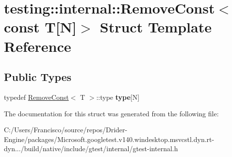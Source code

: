 \hypertarget{structtesting_1_1internal_1_1_remove_const_3_01const_01_t[_n]_4}{}\section{testing\+:\+:internal\+:\+:Remove\+Const$<$ const T\mbox{[}N\mbox{]}$>$ Struct Template Reference}
\label{structtesting_1_1internal_1_1_remove_const_3_01const_01_t[_n]_4}
\subsection*{Public Types}
\begin{DoxyCompactItemize}
\item 
\mbox{\label{structtesting_1_1internal_1_1_remove_const_3_01const_01_t[_n]_4_ac976b53cb5d031a120fafbe790650068}} 
typedef \hyperlink{structtesting_1_1internal_1_1_remove_const}{Remove\+Const}$<$ T $>$\+::type {\bfseries type}\mbox{[}N\mbox{]}
\end{DoxyCompactItemize}


The documentation for this struct was generated from the following file\+:\begin{DoxyCompactItemize}
\item 
C\+:/\+Users/\+Francisco/source/repos/\+Drider-\/\+Engine/packages/\+Microsoft.\+googletest.\+v140.\+windesktop.\+msvcstl.\+dyn.\+rt-\/dyn.../build/native/include/gtest/internal/gtest-\/internal.\+h\end{DoxyCompactItemize}

